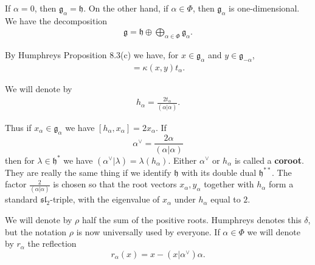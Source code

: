 \documentclass[12pt]{article}
\begin{document}
If $\alpha = 0$, then $\mathfrak{g}_\alpha = \mathfrak{h}$. On the other hand, if $\alpha \in \Phi$, then $\mathfrak{g}_\alpha$ is one-dimensional. We have the decomposition
\begin{align*}
    \mathfrak{g} = \mathfrak{h} \oplus \bigoplus_{\alpha \in \Phi} \mathfrak{g}_\alpha.
\end{align*}

By Humphreys Proposition 8.3(c) we have, for $x \in \mathfrak{g}_\alpha$ and $y \in \mathfrak{g}_{-\alpha}$,
\begin{align*}
    [x,y] = \kappa(x,y)t_\alpha.
\end{align*}

We will denote by
\begin{align*}
    h_\alpha = \frac{2t_\alpha}{(\alpha|\alpha)}.
\end{align*}

Thus if $x_\alpha \in \mathfrak{g}_\alpha$ we have $[h_\alpha, x_\alpha] = 2x_\alpha$. If
\[
    \alpha^\vee = \frac{2\alpha}{(\alpha|\alpha)}
\]
then for $\lambda \in \mathfrak{h}^*$ we have $(\alpha^\vee | \lambda) = \lambda(h_\alpha)$. Either $\alpha^\vee$ or $h_\alpha$ is called a \textbf{coroot}. They are really the same thing if we identify $\mathfrak{h}$ with its double dual $\mathfrak{h}^{**}$. The factor $\tfrac{2}{(\alpha|\alpha)}$ is chosen so that the root vectors $x_\alpha, y_\alpha$ together with $h_\alpha$ form a standard $\mathfrak{sl}_2$-triple, with the eigenvalue of $x_\alpha$ under $h_\alpha$ equal to $2$.

We will denote by $\rho$ half the sum of the positive roots. Humphreys denotes this $\delta$, but the notation $\rho$ is now universally used by everyone. If $\alpha \in \Phi$ we will denote by $r_\alpha$ the reflection
\[
    r_\alpha(x) = x - (x|\alpha^\vee)\alpha.
\]
\end{document}
